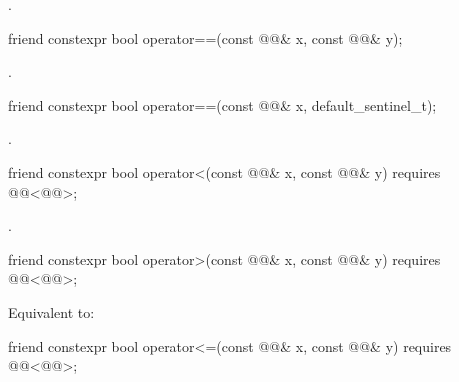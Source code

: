 \begin{itemdescr}
\pnum
\returns
{}.
\end{itemdescr}

%
\begin{itemdecl}
friend constexpr bool operator==(const @@& x, const @@& y);
\end{itemdecl}

\begin{itemdescr}
\pnum
\returns
{}.
\end{itemdescr}

%
\begin{itemdecl}
friend constexpr bool operator==(const @@& x, default_sentinel_t);
\end{itemdecl}

\begin{itemdescr}
\pnum
\returns
{}.
\end{itemdescr}

%
\begin{itemdecl}
friend constexpr bool operator<(const @@& x, const @@& y)
  requires @@<@@>;
\end{itemdecl}

\begin{itemdescr}
\pnum
\returns
{}.
\end{itemdescr}

%
\begin{itemdecl}
friend constexpr bool operator>(const @@& x, const @@& y)
  requires @@<@@>;
\end{itemdecl}

\begin{itemdescr}
\pnum
\effects
Equivalent to: 
\end{itemdescr}

%
\begin{itemdecl}
friend constexpr bool operator<=(const @@& x, const @@& y)
  requires @@<@@>;
\end{itemdecl}

